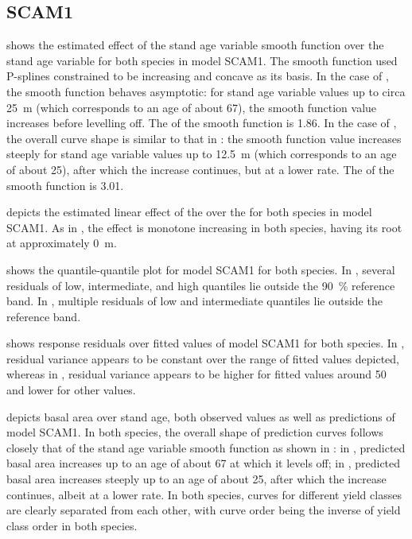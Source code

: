 \subsection{SCAM1}

 shows the estimated effect of the stand age variable smooth function over the stand age variable for both species in model SCAM1.  The smooth function used P-splines constrained to be increasing and concave as its basis.  In the case of \Beech{}, the smooth function behaves asymptotic:  for stand age variable values up to circa \SI{25}{\meter} (which corresponds to an age of about \SI{67}{\year}), the smooth function value increases before levelling off.  The \edf{} of the smooth function is \num{1.86}.  In the case of \Spruce{}, the overall curve shape is similar to that in :  the smooth function value increases steeply for stand age variable values up to \SI{12.5}{\meter} (which corresponds to an age of about \SI{25}{\year}), after which the increase continues, but at a lower rate.  The \edf{} of the smooth function is \num{3.01}.

 depicts the estimated linear effect of the \ProductivityIndexVariableText{} over the \ProductivityIndexVariableText{} for both species in model SCAM1.  As in , the effect is monotone increasing in both species, having its root at approximately \SI{0}{\meter}.

 shows the quantile-quantile plot for model SCAM1 for both species.  In \Beech{}, several residuals of low, intermediate, and high quantiles lie outside the \SI{90}{\percent} reference band.  In \Spruce{}, multiple residuals of low and intermediate quantiles lie outside the reference band.

 shows response residuals over fitted values of model SCAM1 for both species.  In \Beech{}, residual variance appears to be constant over the range of fitted values depicted, whereas in \Spruce{}, residual variance appears to be higher for fitted values around \num{50} and lower for other values.

 depicts basal area over stand age, both observed values as well as predictions of model SCAM1.  In both species, the overall shape of prediction curves follows closely that of the stand age variable smooth function as shown in :  in \Beech{}, predicted basal area increases up to an age of about \SI{67}{\year} at which it levels off;  in \Spruce{}, predicted basal area increases steeply up to an age of about \SI{25}{\year}, after which the increase continues, albeit at a lower rate.  In both species, curves for different yield classes are clearly separated from each other, with curve order being the inverse of yield class order in both species.

